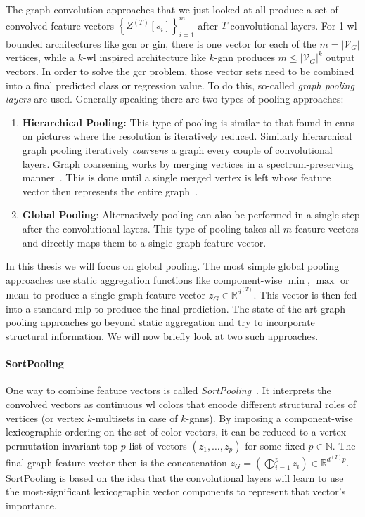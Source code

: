 The graph convolution approaches that we just looked at all produce a set of convolved feature vectors ${\left\{ Z^{(T)}[s_i] \right\}}_{i=1}^{m}$ after $T$ convolutional layers. %
For 1-\acs{wl} bounded architectures like \ac{gcn} or \ac{gin}, there is one vector for each of the $m = {|\mathcal{V}_G|}$ vertices, while a $k$-\acs{wl} inspired architecture like $k$-\acs{gnn} produces $m \leq {|\mathcal{V}_G|}^{k}$ output vectors.
In order to solve the \ac{gcr} problem, those vector sets need to be combined into a final predicted class or regression value.
To do this, so-called \textit{graph pooling layers} are used.
Generally speaking there are two types of pooling approaches:
\begin{enumerate}[label=\textbf{\arabic*.}]
	\item \textbf{Hierarchical Pooling:}
		This type of pooling is similar to that found in \acp{cnn} on pictures where the resolution is iteratively reduced.
		Similarly hierarchical graph pooling iteratively \textit{coarsens} a graph every couple of convolutional layers.
		Graph coarsening works by merging vertices in a spectrum-preserving manner~\cite{Loukas2018}.
		This is done until a single merged vertex is left whose feature vector then represents the entire graph~\cite{Ying2018}.
	\item \textbf{Global Pooling}:
		Alternatively pooling can also be performed in a single step after the convolutional layers.
		This type of pooling takes all $m$ feature vectors and directly maps them to a single graph feature vector.
\end{enumerate}
In this thesis we will focus on global pooling.
The most simple global pooling approaches use static aggregation functions like component-wise $\min$, $\max$ or $\operatorname{mean}$ to produce a single graph feature vector $z_G \in \mathbb{R}^{d^{(T)}}$.
This vector is then fed into a standard \ac{mlp} to produce the final prediction.
The state-of-the-art graph pooling approaches go beyond static aggregation and try to incorporate structural information.
We will now briefly look at two such approaches.

\paragraph{SortPooling}
One way to combine feature vectors is called \textit{SortPooling}~\cite{Zhang2018}.
It interprets the convolved vectors as continuous \ac{wl} colors that encode different structural roles of vertices (or vertex $k$-multisets in case of $k$-\acp{gnn}).
By imposing a component-wise lexicographic ordering on the set of color vectors, it can be reduced to a vertex permutation invariant top-$p$ list of vectors $(z_1, \dots, z_p)$ for some fixed $p \in \mathbb{N}$.
The final graph feature vector then is the concatenation $z_G = \left( \bigoplus_{i=1}^{p} z_i \right) \in \mathbb{R}^{d^{(T)} p}$.
SortPooling is based on the idea that the convolutional layers will learn to use the most-significant lexicographic vector components to represent that vector's importance.

